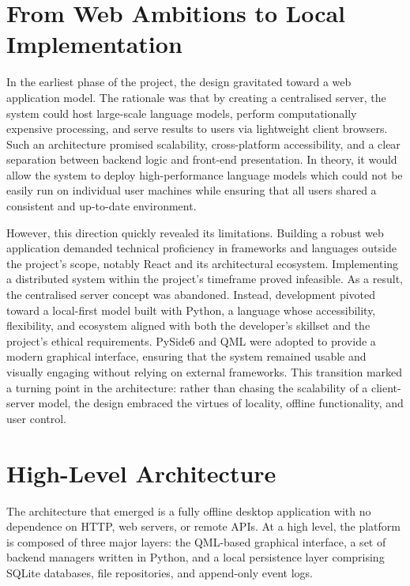 \documentclass{report}
\begin{document}
\section{From Web Ambitions to Local Implementation}

In the earliest phase of the project, the design gravitated toward a web application model. 
The rationale was that by creating a centralised server, the system could host large-scale language models, perform computationally expensive processing, and serve results to users via lightweight client browsers. 
Such an architecture promised scalability, cross-platform accessibility, and a clear separation between backend logic and front-end presentation. 
In theory, it would allow the system to deploy high-performance language models which could not be easily run on individual user machines while ensuring that all users shared a consistent and up-to-date environment.

However, this direction quickly revealed its limitations. Building a robust web application demanded technical proficiency in frameworks and languages outside the project's scope, notably React and its architectural ecosystem. 
Implementing a distributed system within the project's timeframe proved infeasible. 
As a result, the centralised server concept was abandoned. 
Instead, development pivoted toward a local-first model built with Python, a language whose accessibility, flexibility, and ecosystem aligned with both the developer's skillset and the project's ethical requirements. 
PySide6 and QML were adopted to provide a modern graphical interface, ensuring that the system remained usable and visually engaging without relying on external frameworks. 
This transition marked a turning point in the architecture: rather than chasing the scalability of a client-server model, the design embraced the virtues of locality, offline functionality, and user control.

\section{High-Level Architecture}

The architecture that emerged is a fully offline desktop application with no dependence on HTTP, web servers, or remote APIs. 
At a high level, the platform is composed of three major layers: the QML-based graphical interface, a set of backend managers written in Python, and a local persistence layer comprising SQLite databases, file repositories, and append-only event logs.
\end{document}
